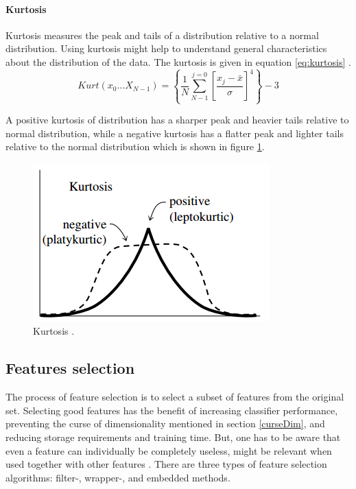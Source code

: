 \documentclass[USenglish]{ifimaster}  %
\begin{document}
	\FloatBarrier
	
\paragraph{Kurtosis}
Kurtosis measures the peak and tails of a distribution relative to a normal distribution. Using kurtosis might help to understand general characteristics about the distribution of the data. The kurtosis is given in equation \ref{eq:kurtosis} \cite{Press:2007:NRE:1403886}.
	\begin{equation}
	Kurt(x_0\dotsc X_{N-1}) = \left \{\frac{1}{N}\sum_{N-1}^{j=0}\left [ \frac{x_j-\bar{x}}{\sigma} \right ]^4 \right \}-3
	\label{eq:kurtosis}
	\end{equation}
	
A positive kurtosis of distribution has a sharper peak and heavier tails relative to normal distribution, while a negative kurtosis has a flatter peak and lighter tails relative to the normal distribution which is shown in figure \ref{fig:kurtosis}.
	
	\begin{figure}[h]
		\centering
		\includegraphics[scale=0.8]{Figures/Kurtosis}
		\caption[Kurtosis]{Kurtosis \cite{Press:2007:NRE:1403886}.}
		\label{fig:kurtosis}
	\end{figure}
	
	
	
	
\subsection{Features selection}\label{selection}	
The process of feature selection is to select a subset of features from the original set. Selecting good features has the benefit of increasing classifier performance, preventing the curse of dimensionality mentioned in section \ref{curseDim}, and reducing storage requirements and training time. But, one has to be aware that even a feature can individually be completely useless, might be relevant when used together with other features \cite{Guyon2006}. There are three types of feature selection algorithms: filter-, wrapper-, and embedded methods. %
	
\end{document}
